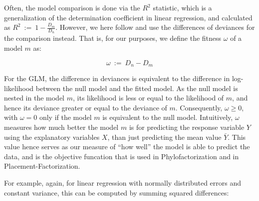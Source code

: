 Often, the model comparison is done via the $R^2$ statistic,
which is a generalization of the determination coefficient in linear regression,
and calculated as $R^2 ~:=~ 1 - \frac{D_m}{D_n}$.
However, we here follow  and use the differences of deviances for the comparison instead.
That is, for our purposes, we define the fitness $\omega$ of a model $m$ as:

\begin{equation}
    \label{sec:Factorization:sub:GLM:eq:deviancedifference}
    \omega ~:=~ D_n - D_m
\end{equation}


For the \ac{GLM}, the difference in deviances is equivalent to the difference in log-likelihood
between the null model and the fitted model.
As the null model is nested in the model $m$, its likelihood is less or equal to the likelihood of $m$,
and hence its deviance greater or equal to the deviance of $m$.
Consequently, $\omega \geq 0$, with $\omega = 0$ only if the model $m$ is equivalent to the null model.
Intuitively, $\omega$ measures how much better the model $m$ is for predicting the response variable $Y$
using the explanatory variables $X$, than just predicting the mean value $\bar{Y}$.
This value hence serves as our measure of ``how well'' the model is able to predict the data,
and is the objective funcation that is used in Phylofactorization and in Placement-Factorization.

For example, again, for linear regression with normally distributed errors and constant variance,
this can be computed by summing squared differences:

